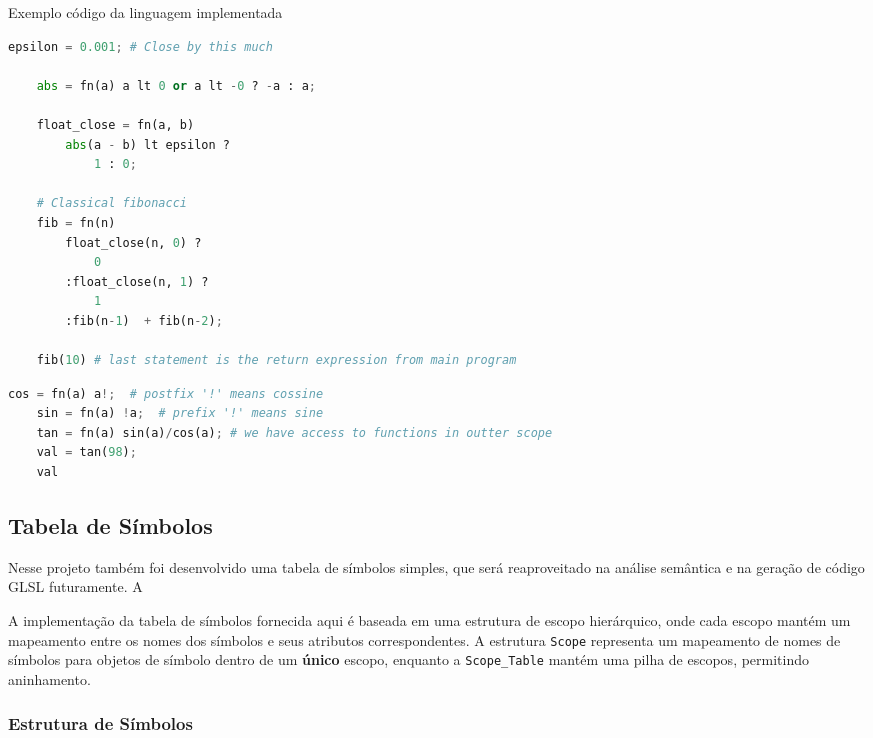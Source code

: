 \documentclass[english, 
               brazil, 
               bsc] %
               {dcomp-abntex2}
\begin{document}
\begin{algoritmo}[H]
	\caption{Exemplo código da linguagem implementada}
	\label{alg1}
	\label{alg1}
  \begin{lstlisting}[language = python]
    epsilon = 0.001; # Close by this much

    abs = fn(a) a lt 0 or a lt -0 ? -a : a;

    float_close = fn(a, b) 
        abs(a - b) lt epsilon ? 
            1 : 0;

    # Classical fibonacci
    fib = fn(n)  
        float_close(n, 0) ? 
            0
        :float_close(n, 1) ?
            1
        :fib(n-1)  + fib(n-2);

    fib(10) # last statement is the return expression from main program
  \end{lstlisting}
\end{algoritmo}


\begin{algoritmo}[H]
  \begin{lstlisting}[language = python]
    cos = fn(a) a!;  # postfix '!' means cossine
    sin = fn(a) !a;  # prefix '!' means sine
    tan = fn(a) sin(a)/cos(a); # we have access to functions in outter scope
    val = tan(98);    
    val 
  \end{lstlisting}
\end{algoritmo}



\subsection{Tabela de Símbolos}

Nesse projeto também foi desenvolvido uma tabela de símbolos simples, que será reaproveitado na análise semântica e na geração de código GLSL futuramente. A

A implementação da tabela de símbolos fornecida aqui é baseada em uma estrutura de escopo hierárquico, onde cada escopo mantém um mapeamento entre os nomes dos símbolos e seus atributos correspondentes. A estrutura \texttt{Scope} representa um mapeamento de nomes de símbolos para objetos de símbolo dentro de um \textbf{único} escopo, enquanto a \texttt{Scope\_Table} mantém uma pilha de escopos, permitindo aninhamento.

\subsubsection{Estrutura de Símbolos}
\end{document}
